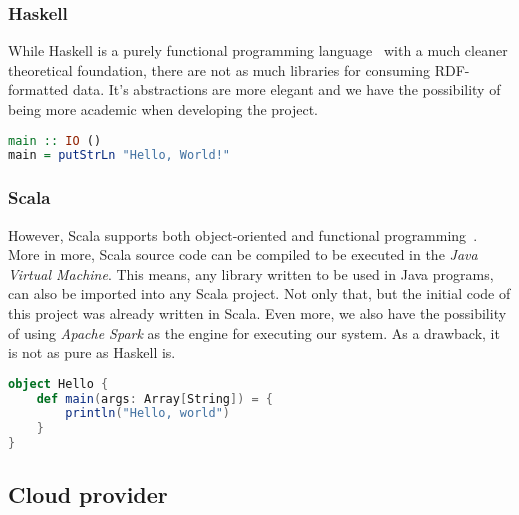 \subsubsection{Haskell}

While Haskell is a purely functional programming language~\cite{wiki:Haskell} with a much cleaner theoretical foundation, there are not as much libraries for consuming RDF-formatted data. It's abstractions are more elegant and we have the possibility of being more academic when developing the project.

\begin{lstlisting}[language=Haskell, caption=\textit{Hello World!} program written in Haskell]
main :: IO ()
main = putStrLn "Hello, World!"
\end{lstlisting}

\subsubsection{Scala}

However, Scala supports both object-oriented and functional programming~\cite{wiki:Scala_programming_language}. More in more, Scala source code can be compiled to be executed in the \textit{Java Virtual Machine}. This means, any library written to be used in Java programs, can also be imported into any Scala project. Not only that, but the initial code of this project was already written in Scala. Even more, we also have the possibility of using \textit{Apache Spark} as the engine for executing our system. As a drawback, it is not as pure as Haskell is.

\begin{lstlisting}[language=Scala, caption=\textit{Hello World!} program written in Scala 2]
object Hello {
    def main(args: Array[String]) = {
        println("Hello, world")
    }
}
\end{lstlisting}

\subsection{Cloud provider}